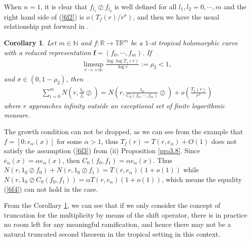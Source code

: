 \documentclass{article}
\newtheorem{corollary}[defin]{Corollary}
\begin{document}
When $n=1$, it is clear that $f_{l_{1}}\oslash f_{l_{2}}$ is well defined for all $l_{1}, l_{2}=0,\cdots, m$ and the right hand side of (\ref{6f2}) is $o(T_{f}(r)\slash r^{\sigma})$, and then we have the usual relationship put forward in \cite{Pro}.

\begin{corollary}\label{cor6.3}
    Let $m\in\mathbb{N}$ and $f:\mathbb{R}\rightarrow \mathbb{T}\mathbb{R}^{m}$ be a $1$-st tropical holomorphic curve with a reduced representation $\textbf{f}=(f_{0}, \cdots, f_{m})$. If
    \begin{eqnarray}\label{6f3}
        \limsup\limits_{r\rightarrow +\infty}\frac{\log\log T_{f}(r)}{\log r}:=\rho_{2}<1,
    \end{eqnarray}
    and $\sigma\in(0, 1-\rho_{2})$, then
    \begin{eqnarray}\label{6f4}
        \sum_{i=0}^{m}N\left(r, \frac{1_{0}}{f_{i}}\oslash\right)=N\left(r, \frac{1_{0}}{C_{0}(f_{0}, \cdots, f_{m})}\oslash\right)+o\left(\frac{T_{f}(r)}{r^{\sigma}}\right)
    \end{eqnarray}
    where $r$ approaches infinity outside an exceptional set of finite logarithmic measure.
\end{corollary}

The growth condition can not be dropped, as we can see from the example that $f=[0:  e_{\alpha}(x)]$ for some $\alpha>1$, thus $T_{f}(r)=T(r, e_{\alpha})+O(1)$ does not satisfy the assumption (\ref{6f3}) from (ii) Proposition \ref{pro3.8}. Since $\overline{e}_{\alpha}(x)=\alpha e_{\alpha}(x)$, then $C_{0}(f_{0}, f_{1})=\alpha e_{\alpha}(x)$. Thus $N(r, 1_{0}\oslash f_{0})+N(r, 1_{0}\oslash f_{1})=T(r, e_{\alpha})(1+o(1))$ while $N(r, 1_{0}\oslash C_{0}(f_{0}, f_{1}))=\alpha T(r, e_{\alpha})(1+o(1))$, which means the equality (\ref{6f4}) can not hold in the case.

From the Corollary \ref{cor6.3}, we can see that if we only consider the concept of truncation for the multiplicity by means of the shift operator, there is in practice no room left for any meaningful ramification, and hence there may not be a natural truncated second theorem in the tropical setting in this context. 
   
\end{document}
